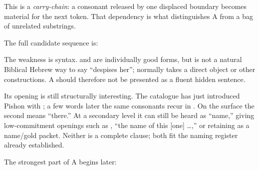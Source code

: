 This is a \emph{carry-chain}: a consonant released by one displaced boundary becomes material for the next token. That dependency is what distinguishes A from a bag of unrelated substrings.

The full candidate sequence is:


The weakness is syntax.  and  are individually good forms, but  is not a natural Biblical Hebrew way to say ``despises her'';  normally takes a direct object or other constructions.\cite{BDB} A should therefore not be presented as a fluent hidden sentence.

Its opening is still structurally interesting. The catalogue has just introduced Pishon with ; a few words later the same consonants recur in . On the surface the second  means ``there.'' At a secondary level it can still be heard as ``name,'' giving low-commitment openings such as , ``the name of this [one] \ldots,'' or retaining  as a name/gold packet. Neither is a complete clause; both fit the naming register already established.

The strongest part of A begins later:


